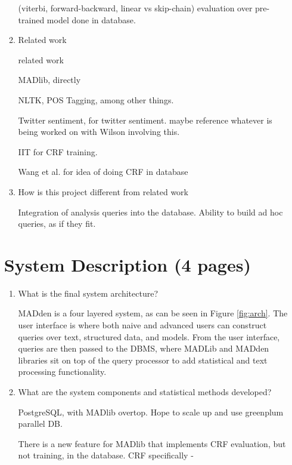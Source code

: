 \documentclass{article}
\newcommand{\system}{MADden\xspace}
\begin{document}
\begin{enumerate}
\begin{enumerate}
    (viterbi, forward-backward, linear vs skip-chain) evaluation over pre-trained model done in database.



  \item Related work

    related work

    MADlib, directly

    NLTK, POS Tagging, among other things.

    Twitter sentiment, for twitter sentiment. maybe reference whatever is being worked on with Wilson involving this.

    IIT for CRF training.

    Wang et al. for idea of doing CRF in database

  \item How is this project different from related work

    Integration of analysis queries into the database.
    Ability to build ad hoc queries, as if they fit.
  \end{enumerate}






  \section{System Description (4 pages)}
  \begin{enumerate}
  \item What is the final system architecture?

    {\system} is a four layered system, as can be seen in Figure \ref{fig:arch}.
    The user interface is where both naive and advanced users can construct queries over text, structured data, and models.
    From the user interface,
    queries are then passed to the DBMS,
    where MADLib and {\system} libraries sit on top of the query processor to add statistical and text processing functionality.

  \item What are the system components and statistical methods developed?

    PostgreSQL, with MADlib overtop.
    Hope to scale up and use greenplum parallel DB.

    There is a new feature for MADlib that implements CRF evaluation, but not training, in the database.
    CRF specifically -


\end{enumerate}
\end{enumerate}
\end{document}
